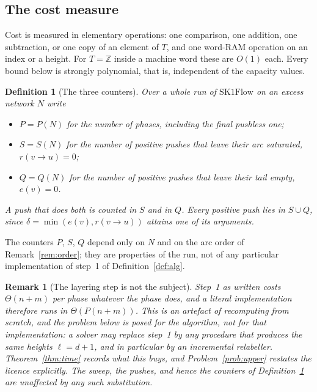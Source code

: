 \documentclass[10pt]{article}
\newtheorem{definition}{Definition}
\newtheorem{remark}[theorem]{Remark}
\newcommand{\SKF}{\text{SK1Flow}}
\newcommand{\arc}[2]{#1\!\to\!#2}
\begin{document}
\subsection{The cost measure}

Cost is measured in elementary operations: one comparison, one addition, one
subtraction, or one copy of an element of $T$, and one word-RAM operation on an
index or a height. For $T=\mathbb{Z}$ inside a machine word these are $O(1)$
each. Every bound below is strongly polynomial, that is, independent of the
capacity values.

\begin{definition}[The three counters]\label{def:counters}
Over a whole run of $\SKF$ on an excess network $N$ write
\begin{itemize}
  \item $P=P(N)$ for the number of phases, including the final pushless one;
  \item $S=S(N)$ for the number of positive pushes that leave their arc
  saturated, $r(\arc{v}{u})=0$;
  \item $Q=Q(N)$ for the number of positive pushes that leave their tail empty,
  $e(v)=0$.
\end{itemize}
A push that does both is counted in $S$ and in $Q$. Every positive push lies in
$S\cup Q$, since $\delta=\min(e(v),r(\arc{v}{u}))$ attains one of its
arguments.
\end{definition}

The counters $P$, $S$, $Q$ depend only on $N$ and on the arc order of
Remark~\ref{rem:order}; they are properties of the run, not of any particular
implementation of step~1 of Definition~\ref{def:alg}.

\begin{remark}[The layering step is not the subject]\label{rem:layering}
Step~1 as written costs $\Theta(n+m)$ per phase whatever the phase does, and a
literal implementation therefore runs in $\Theta(P(n+m))$. This is an artefact
of recomputing from scratch, and the problem below is posed for the
\emph{algorithm}, not for that implementation: a solver may replace step~1 by
any procedure that produces the same heights $\ell=d+1$, and in particular by
an incremental relabeller. Theorem~\ref{thm:time} records what this buys,
and Problem~\ref{prob:upper} restates the licence explicitly. The sweep, the
pushes, and hence the counters of Definition~\ref{def:counters} are unaffected
by any such substitution.
\end{remark}
\end{document}
